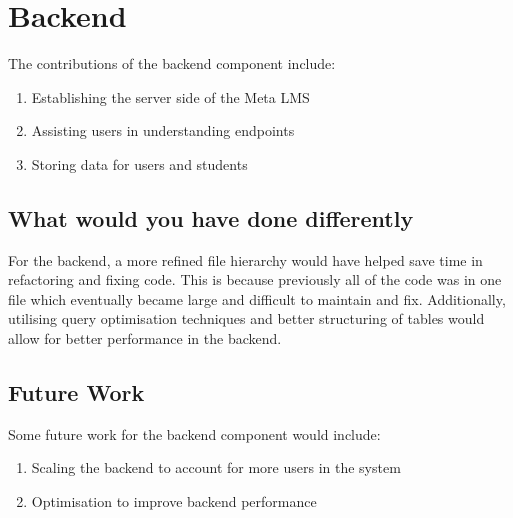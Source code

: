 \section{Backend}
The contributions of the backend component include:
\begin{enumerate}
    \item Establishing the server side of the Meta LMS
    \item Assisting users in understanding endpoints
    \item Storing data for users and students
\end{enumerate}

\subsection{What would you have done differently}
For the backend, a more refined file hierarchy would have helped save time in refactoring and fixing code. This is because previously all of the code was in one file which eventually became large and difficult to maintain and fix. Additionally, utilising query optimisation techniques and better structuring of tables would allow for better performance in the backend.

\subsection{Future Work}
Some future work for the backend component would include:
\begin{enumerate}
    \item Scaling the backend to account for more users in the system
    \item Optimisation to improve backend performance
\end{enumerate}